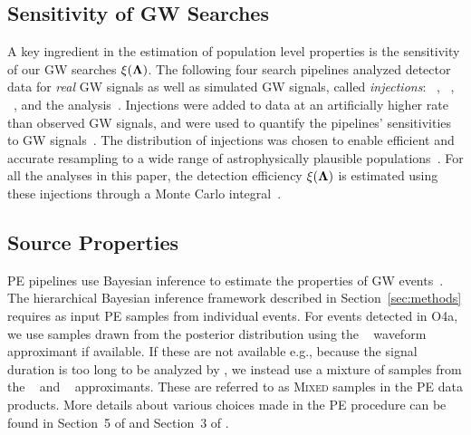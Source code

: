 \subsection{Sensitivity of \ac{GW} Searches}
A key ingredient in the estimation of population level properties 
is the sensitivity of our \ac{GW} searches $\xi(\boldsymbol{\Lambda})$. 
The following four search pipelines analyzed detector data for \textit{real} 
\ac{GW} signals as well as simulated \ac{GW} signals, called \textit{injections}: 
\GSTLAL
~\citep{Messick:2016aqy, Sachdev:2019vvd, Hanna:2019ezx, Cannon:2020qnf, Ewing:2023qqe, Tsukada:2023edh, Sakon:2022ibh, Ray:2023nhx, Joshi:2025nty, Joshi:2025zdu}, 
\MBTA~\citep{Adams:2015ulm, Aubin:2020goo, Andres:2021vew, Allene:2025saz}, 
\PYCBC~\citep{Usman:2015kfa, Nitz:2017svb, Nitz:2018rgo, DalCanton:2020vpm}, 
and the \CWB analysis~\citep{Klimenko:2005xv, Klimenko:2008fu, Klimenko:2015ypf, Tiwari:2015bda, Drago:2020kic, Klimenko:2022nji, Mishra:2021tmu, Mishra:2022ott, Mishra:2024zzs}.
Injections were added to data at an artificially higher rate than observed \ac{GW} 
signals, and were used to quantify the pipelines' sensitivities to \ac{GW} 
signals~\citep{Essick:2025zed, GWTC:Methods}.
The distribution of injections was chosen to enable efficient and accurate 
resampling to a wide range of astrophysically plausible populations~\citep{Essick:2025zed}. 
For all the analyses in this paper, the detection efficiency $\xi(\boldsymbol{\Lambda})$ 
is estimated using these injections through a Monte Carlo 
integral~\citep{GWTC:Methods, Tiwari:2017ndi, Farr:2019rap}.

\subsection{Source Properties}
\Ac{PE} pipelines use Bayesian inference to estimate the properties of GW events~\citep{GWTC:Methods}.
The hierarchical Bayesian inference framework described in Section~\ref{sec:methods} 
requires as input \ac{PE} samples from individual events. 
For events detected in \ac{O4a}, we use samples drawn from the posterior distribution using
the \SURSEVENDQFOUR{}~\citep{Varma:2019csw} waveform approximant if available. If these are not available e.g., because the signal duration is too long to be analyzed by \SURSEVENDQFOUR{}, we instead use a mixture of samples from the \IMRPhenomXPHMST{}~\citep{Pratten:2020ceb,Colleoni:2024knd} and \SEOBNRFIVEPHM{}~\citep{Ramos-Buades:2023ehm, Pompili:2023tna} approximants.
These are referred to as \textsc{Mixed} samples in the \ac{PE} data products. 
More details about various choices made in the \ac{PE} procedure can be found
in Section~5 of \citet{GWTC:Methods} and Section~3 of \citet{GWTC:Results}.

